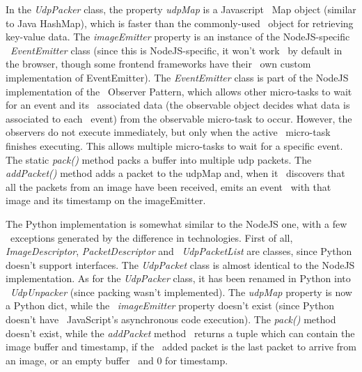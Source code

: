 In the \textit{UdpPacker} class, the property \textit{udpMap} is a Javascript \
Map object (similar to Java HashMap), which is faster than the commonly-used \
object for retrieving key-value data.
The \textit{imageEmitter} property is an instance of the NodeJS-specific \
\textit{EventEmitter} class (since this is NodeJS-specific, it won't work \
by default in the browser, though some frontend frameworks have their \
own custom implementation of EventEmitter).
The \textit{EventEmitter} class is part of the NodeJS implementation of the \
Observer Pattern, which allows other micro-tasks to wait for an event and its \
associated data (the observable object decides what data is associated to each \
event) from the observable micro-task to occur.
However, the observers do not execute immediately, but only when the active \
micro-task finishes executing.
This allows multiple micro-tasks to wait for a specific event.
The static \textit{pack()} method packs a buffer into multiple udp packets.
The \textit{addPacket()} method adds a packet to the udpMap and, when it \
discovers that all the packets from an image have been received, emits an event \
with that image and its timestamp on the imageEmitter.

The Python implementation is somewhat similar to the NodeJS one, with a few \
exceptions generated by the difference in technologies.
First of all, \textit{ImageDescriptor}, \textit{PacketDescriptor} and \
\textit{UdpPacketList} are classes, since Python doesn't support interfaces.
The \textit{UdpPacket} class is almost identical to the NodeJS implementation.
As for the \textit{UdpPacker} class, it has been renamed in Python into \
\textit{UdpUnpacker} (since packing wasn't implemented).
The \textit{udpMap} property is now a Python dict, while the \
\textit{imageEmitter} property doesn't exist (since Python doesn't have \
JavaScript's asynchronous code execution).
The \textit{pack()} method doesn't exist, while the \textit{addPacket} method \
returns a tuple which can contain the image buffer and timestamp, if the \
added packet is the last packet to arrive from an image, or an empty buffer \
and 0 for timestamp.


